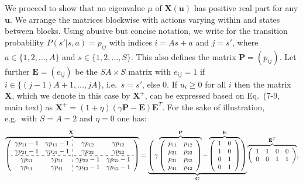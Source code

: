 \documentclass[a4paper,11pt]{article}
\newcommand{\vu}{{\mathbf u}}
\newcommand{\vX}{{\mathbf X}}
\newcommand{\vC}{{\mathbf C}}
\newcommand{\vE}{{\mathbf E}}
\newcommand{\vP}{{\mathbf P}}
\begin{document}
We proceed to show that no eigenvalue $\mu$ of $\vX(\vu)$ has positive real part for any $\vu$.
We arrange the matrices blockwise with actions varying within and states between blocks. Using abusive but concise notation, we write for the transition probability $P(s'|s,a)= p_{ij}$ with indices $i=As+a$ and $j=s'$, where $a\in\{1,2,...,A\}$ and $s \in\{1,2,...,S\}$. This also defines the matrix $\vP=(p_{ij})$. Let further $\vE=(e_{ij})$ be the $SA\times S$ matrix with $e_{ij}=1$ if $i\in\{(j-1)A+1,...,jA\}$, i.e.\ $s=s'$, else $0$. 
If $u_i\geq0$ for all $i$ then the matrix $\vX$, which we denote in this case by $\vX^{\!+}$, can be expressed based on Eq.~(7-9, main text) as $\vX^{\!+}=(1+\eta)(\gamma\vP-\vE)\vE^T$. For the sake of illustration, e.g.\ with $S=A=2$ and $\eta=0$ one has:
\footnotesize%
\setlength{\arraycolsep}{3pt}
$$
\overbrace{
\left(
\begin{array}{cc:cc}
 \gamma p_{11}-1& \gamma  p_{11}-1 & \gamma p_{12}   & \gamma p_{12}  \\
 \gamma p_{21}-1& \gamma  p_{21}-1 & \gamma p_{22}   & \gamma p_{22}  \\ \hdashline
 \gamma p_{31}  & \gamma  p_{31}   & \gamma p_{32}-1 & \gamma p_{32}-1\\
 \gamma p_{41}  & \gamma  p_{41}   & \gamma p_{42}-1 & \gamma p_{42}-1
\end{array}
\right)}^{\vX^{\!+}}
=
\underbrace{
\left(
 \vphantom{\begin{array}{c}\\\\\\\\\end{array}}
\right.\!\!\left.
\gamma
\overbrace{
\left(
\begin{array}{cc}
 p_{11} &  p_{12} \\
 p_{21} &  p_{22} \\
 p_{31} &  p_{32} \\
 p_{41} &  p_{42}
\end{array}
\right)}^{\vP}
-
\overbrace{
\left(
\begin{array}{cc}
  1 & 0 \\
  1 & 0 \\
  0 & 1 \\
  0 & 1
\end{array}
\right)}^{\vE}
\right.\!\!\left.
\vphantom{\begin{array}{c}\\\\\\\\\end{array}}
\right)
}_{\vC}
\overbrace{
\left(
\begin{array}{cccc}
  1 & 1 & 0 & 0 \\
  0 & 0 & 1 & 1
\end{array}
\right) }^{\vE^T},
$$
\end{document}
